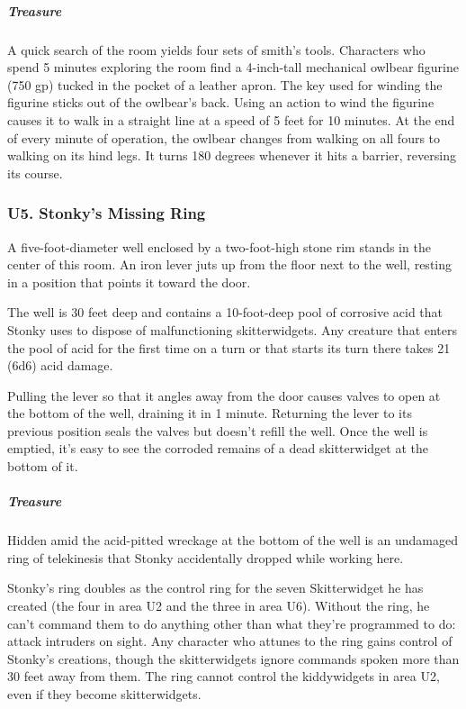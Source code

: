 \documentclass[10pt,a4paper,twoside,bg=print,twocolumn,openany,nodeprecatedcode]{dndbook}
\begin{document}
\subparagraph{Treasure}
A quick search of the room yields four sets of smith's tools. Characters who spend 5 minutes exploring the room find a 4-inch-tall mechanical owlbear figurine (750 gp) tucked in the pocket of a leather apron. The key used for winding the figurine sticks out of the owlbear's back. Using an action to wind the figurine causes it to walk in a straight line at a speed of 5 feet for 10 minutes. At the end of every minute of operation, the owlbear changes from walking on all fours to walking on its hind legs. It turns 180 degrees whenever it hits a barrier, reversing its course.

\subsubsection{U5. Stonky's Missing Ring}
\begin{DndReadAloud}{}
A five-foot-diameter well enclosed by a two-foot-high stone rim stands in the center of this room. An iron lever juts up from the floor next to the well, resting in a position that points it toward the door.

\end{DndReadAloud}

The well is 30 feet deep and contains a 10-foot-deep pool of corrosive acid that Stonky uses to dispose of malfunctioning skitterwidgets. Any creature that enters the pool of acid for the first time on a turn or that starts its turn there takes 21 (6d6) acid damage.

Pulling the lever so that it angles away from the door causes valves to open at the bottom of the well, draining it in 1 minute. Returning the lever to its previous position seals the valves but doesn't refill the well. Once the well is emptied, it's easy to see the corroded remains of a dead skitterwidget at the bottom of it.

\subparagraph{Treasure}
Hidden amid the acid-pitted wreckage at the bottom of the well is an undamaged ring of telekinesis that Stonky accidentally dropped while working here.

Stonky's ring doubles as the control ring for the seven Skitterwidget he has created (the four in area U2 and the three in area U6). Without the ring, he can't command them to do anything other than what they're programmed to do: attack intruders on sight. Any character who attunes to the ring gains control of Stonky's creations, though the skitterwidgets ignore commands spoken more than 30 feet away from them. The ring cannot control the kiddywidgets in area U2, even if they become skitterwidgets.
\end{document}
